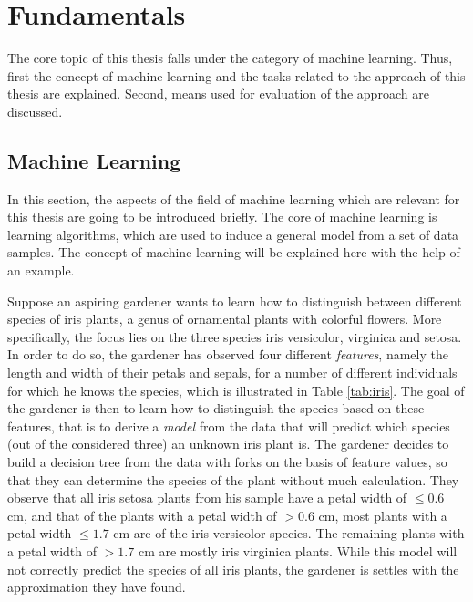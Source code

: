 %
\chapter{Fundamentals}
\label{sec:fundamentals}

The core topic of this thesis falls under the category of machine learning. Thus, first the concept of machine learning and the tasks related to the approach of this thesis are explained. Second, means used for evaluation of the approach are discussed.

\section{Machine Learning}
In this section, the aspects of the field of machine learning which are relevant for this thesis are going to be introduced briefly. The core of machine learning is learning algorithms, which are used to induce a general model from a set of data samples. The concept of machine learning will be explained here with the help of an example. %

Suppose an aspiring gardener wants to learn how to distinguish between different species of iris plants, a genus of ornamental plants with colorful flowers. More specifically, the focus lies on the three species iris versicolor, virginica and setosa. In order to do so, the gardener has observed four different \textit{features}, namely the length and width of their petals and sepals, for a number of different individuals for which he knows the species, which is illustrated in Table \ref{tab:iris}. The goal of the gardener is then to learn how to distinguish the species based on these features, that is to derive a \textit{model} from the data that will predict which species (out of the considered three) an unknown iris plant is. The gardener decides to build a decision tree from the data with forks on the basis of feature values, so that they can determine the species of the plant without much calculation. They observe that all iris setosa plants from his sample have a petal width of $\leq 0.6 $ cm, and that of the plants with a petal width of $>0.6$ cm, most plants with a petal width $\leq 1.7$ cm are of the iris versicolor species. The remaining plants with a petal width of $>1.7$ cm are mostly iris virginica plants. While this model will not correctly predict the species of all iris plants, the gardener is settles with the approximation they have found.

